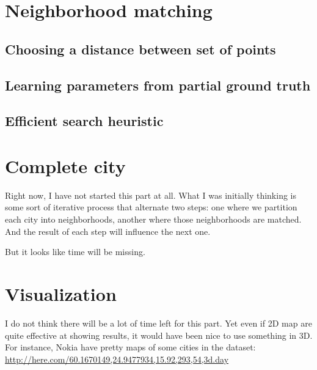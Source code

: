 \section{Neighborhood matching}

\subsection{Choosing a distance between set of points}
\subsection{Learning parameters from partial ground truth}
\subsection{Efficient search heuristic}

\section{Complete city}

\begin{comments}
Right now, I have not started this part at all. What I was initially thinking
is some sort of iterative process that alternate two steps: one where we
partition each city into neighborhoods, another where those neighborhoods are
matched. And the result of each step will influence the next one.

But it looks like time will be missing.
\end{comments}

\section{Visualization}
\begin{comments}
I do not think there will be a lot of time left for this part. Yet even if 2D
map are quite effective at showing results, it would have been nice to use
something in 3D. For instance, Nokia have pretty maps of some cities in the
dataset: \href{http://here.com/60.1670149,24.9477934,15.92,293,54,3d.day}%
{\url{http://here.com/60.1670149,24.9477934,15.92,293,54,3d.day}}
\end{comments}
